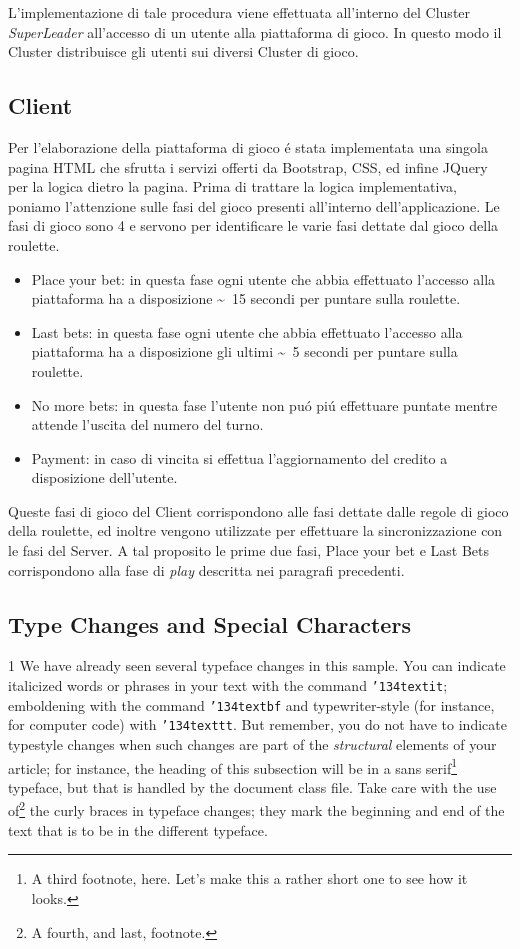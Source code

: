 \documentclass{sig-alternate-05-2015}
\begin{document}
L'implementazione di tale procedura viene effettuata all'interno del Cluster \textit{SuperLeader} all'accesso di un utente alla piattaforma di gioco. In questo modo il Cluster distribuisce gli utenti sui diversi Cluster di gioco.

\subsection{Client}

Per l'elaborazione della piattaforma di gioco \'e stata implementata una singola pagina HTML che sfrutta  i servizi offerti da Bootstrap, CSS, ed infine JQuery per la logica dietro la pagina.
Prima di trattare la logica implementativa, poniamo l'attenzione sulle fasi del gioco presenti all'interno dell'applicazione.
Le fasi di gioco sono 4 e servono per identificare le varie fasi dettate dal gioco della roulette.
\begin{itemize}
\item Place your bet: in questa fase ogni utente che abbia effettuato l'accesso alla piattaforma ha a disposizione \sim{~}15 secondi per puntare sulla roulette.
\item Last bets: in questa fase ogni utente che abbia effettuato l'accesso alla piattaforma ha a disposizione gli ultimi \sim{~}5 secondi per puntare sulla roulette.
\item No more bets: in questa fase l'utente non pu\'o pi\'u effettuare puntate mentre attende l'uscita del numero del turno.
\item Payment: in caso di vincita si effettua l'aggiornamento del credito a disposizione dell'utente.
\end{itemize}

Queste fasi di gioco del Client corrispondono alle fasi dettate dalle regole di gioco della roulette, ed inoltre vengono utilizzate per effettuare la sincronizzazione con le fasi del Server.
A tal proposito le prime due fasi, Place your bet e Last Bets corrispondono alla fase di \textit{play} descritta nei paragrafi precedenti. 
 
\subsection{Type Changes and {\subsecit Special} Characters}1
We have already seen several typeface changes in this sample.  You
can indicate italicized words or phrases in your text with
the command \texttt{{\char'134}textit}; emboldening with the
command \texttt{{\char'134}textbf}
and typewriter-style (for instance, for computer code) with
\texttt{{\char'134}texttt}.  But remember, you do not
have to indicate typestyle changes when such changes are
part of the \textit{structural} elements of your
article; for instance, the heading of this subsection will
be in a sans serif\footnote{A third footnote, here.
Let's make this a rather short one to
see how it looks.} typeface, but that is handled by the
document class file. Take care with the use
of\footnote{A fourth, and last, footnote.}
the curly braces in typeface changes; they mark
the beginning and end of
the text that is to be in the different typeface.
\end{document}
